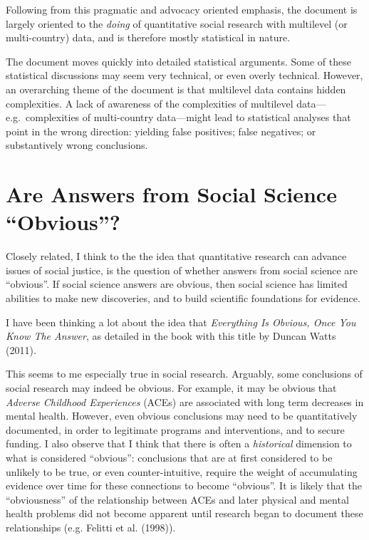 \documentclass[
  letterpaper,
  DIV=11,
  numbers=noendperiod]{scrreprt}
\begin{document}
Following from this pragmatic and advocacy oriented emphasis, the
document is largely oriented to the \emph{doing} of quantitative social
research with multilevel (or multi-country) data, and is therefore
mostly statistical in nature.

The document moves quickly into detailed statistical arguments. Some of
these statistical discussions may seem very technical, or even overly
technical. However, an overarching theme of the document is that
multilevel data contains hidden complexities. A lack of awareness of the
complexities of multilevel data---e.g.~complexities of multi-country
data---might lead to statistical analyses that point in the wrong
direction: yielding false positives; false negatives; or substantively
wrong conclusions.

\section{Are Answers from Social Science
``Obvious''?}\label{are-answers-from-social-science-obvious}

Closely related, I think to the the idea that quantitative research can
advance issues of social justice, is the question of whether answers
from social science are ``obvious''. If social science answers are
obvious, then social science has limited abilities to make new
discoveries, and to build scientific foundations for evidence.

I have been thinking a lot about the idea that \emph{Everything Is
Obvious, Once You Know The Answer}, as detailed in the book with this
title by Duncan Watts (2011).

This seems to me especially true in social research. Arguably, some
conclusions of social research may indeed be obvious. For example, it
may be obvious that \emph{Adverse Childhood Experiences} (ACEs) are
associated with long term decreases in mental health. However, even
obvious conclusions may need to be quantitatively documented, in order
to legitimate programs and interventions, and to secure funding. I also
observe that I think that there is often a \emph{historical} dimension
to what is considered ``obvious'': conclusions that are at first
considered to be unlikely to be true, or even counter-intuitive, require
the weight of accumulating evidence over time for these connections to
become ``obvious''. It is likely that the ``obviousness'' of the
relationship between ACEs and later physical and mental health problems
did not become apparent until research began to document these
relationships (e.g. Felitti et al. (1998)).
\end{document}
